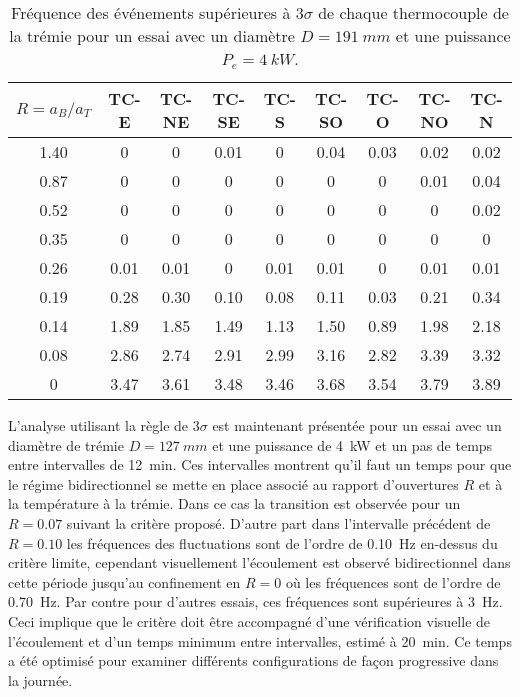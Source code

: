 \begin{table}[H]
\centering
\caption{Fréquence des événements supérieures à $3\sigma$ de chaque thermocouple de la trémie pour un essai avec un diamètre $D=\SI{191}{mm}$ et une puissance $P_e=\SI{4}{kW}$.}
\begin{tabular}{c c c c c c c c c}
\hline
$R=a_B/a_T$ & TC-E & TC-NE & TC-SE & TC-S & TC-SO & TC-O & TC-NO & TC-N \rule{0pt}{14pt}\\[0.5ex]
\hline
1.40 & 0 & 0 & 0.01 & 0 & 0.04 & 0.03 & 0.02 & 0.02 \\
0.87 & 0 & 0 & 0 & 0 & 0 & 0 & 0.01 & 0.04 \\
0.52 & 0 & 0 & 0 & 0 & 0 & 0 & 0 & 0.02 \\
0.35 & 0 & 0 & 0 & 0 & 0 & 0 & 0 & 0 \\
0.26 & 0.01 & 0.01 & 0 & 0.01 & 0.01 & 0 & 0.01 & 0.01 \\
0.19 & 0.28 & 0.30 & 0.10 & 0.08 & 0.11 & 0.03 & 0.21 & 0.34 \\
0.14 & 1.89 & 1.85 & 1.49 & 1.13 & 1.50 & 0.89 & 1.98 & 2.18 \\
0.08 & 2.86 & 2.74 & 2.91 & 2.99 & 3.16 & 2.82 & 3.39 & 3.32 \\
0 & 3.47 & 3.61 & 3.48 & 3.46 & 3.68 & 3.54 & 3.79 & 3.89 \\
\hline
\end{tabular}
\label{tab:freq_3_sigma_D191_2R}
\end{table}

L'analyse utilisant la règle de $3\sigma$ est maintenant présentée pour un essai avec un diamètre de trémie $D=\SI{127}{mm}$ et une puissance de \SI{4}{kW} et un pas de temps entre intervalles de \SI{12}{min}. Ces intervalles montrent qu'il faut un temps pour que le régime bidirectionnel se mette en place associé au rapport d'ouvertures $R$ et à la température à la trémie. Dans ce cas la transition est observée pour un $R=0.07$ suivant la critère proposé. D'autre part dans l'intervalle précédent de $R=0.10$ les fréquences des fluctuations sont de l'ordre de \SI{0.10}{Hz} en-dessus du critère limite, cependant visuellement l'écoulement est observé bidirectionnel dans cette période jusqu'au confinement en $R=0$ où les fréquences sont de l'ordre de \SI{0.70}{Hz}. Par contre pour d'autres essais, ces fréquences sont supérieures à \SI{3}{Hz}. Ceci implique que le critère doit être accompagné d'une vérification visuelle de l'écoulement et d'un temps minimum entre intervalles, estimé à \SI{20}{min}. Ce temps a été optimisé pour examiner différents configurations de façon progressive dans la journée.

